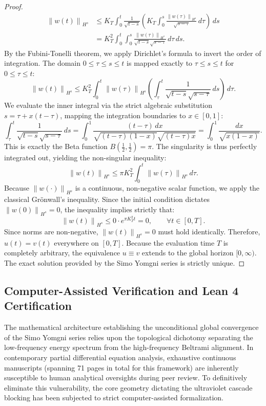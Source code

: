 \documentclass[12pt,a4paper]{article}
\theoremstyle{plain}
\theoremstyle{definition}
\theoremstyle{remark}
\newcommand{\norm}[1]{\left\|#1\right\|}
\begin{document}
\begin{proof}
\begin{align*}
  \norm{w(t)}_{H^s} 
  &\le K_T \int_0^t \frac{1}{\sqrt{t-s}} \left( K_T \int_0^s \frac{\norm{w(\tau)}_{H^s}}{\sqrt{s-\tau}} \,d\tau \right) \,ds \\
  &= K_T^2 \int_0^t \int_0^s \frac{\norm{w(\tau)}_{H^s}}{\sqrt{t-s}\sqrt{s-\tau}} \,d\tau \,ds.
\end{align*}
By the Fubini-Tonelli theorem, we apply Dirichlet's formula to invert the order of integration. The domain $0 \le \tau \le s \le t$ is mapped exactly to $\tau \le s \le t$ for $0 \le \tau \le t$:
\[
  \norm{w(t)}_{H^s} \le K_T^2 \int_0^t \norm{w(\tau)}_{H^s} \left( \int_\tau^t \frac{1}{\sqrt{t-s}\sqrt{s-\tau}} \,ds \right) \,d\tau.
\]
We evaluate the inner integral via the strict algebraic substitution $s = \tau + x(t-\tau)$, mapping the integration boundaries to $x \in [0,1]$:
\[
  \int_\tau^t \frac{1}{\sqrt{t-s}\sqrt{s-\tau}} \,ds = \int_0^1 \frac{(t-\tau)\,dx}{\sqrt{(t-\tau)(1-x)}\sqrt{(t-\tau)x}} = \int_0^1 \frac{dx}{\sqrt{x(1-x)}}.
\]
This is exactly the Beta function $B(\frac{1}{2}, \frac{1}{2}) = \pi$. The singularity is thus perfectly integrated out, yielding the non-singular inequality:
\[
  \norm{w(t)}_{H^s} \le \pi K_T^2 \int_0^t \norm{w(\tau)}_{H^s} \,d\tau.
\]
Because $\norm{w(\cdot)}_{H^s}$ is a continuous, non-negative scalar function, we apply the classical Grönwall's inequality. Since the initial condition dictates $\norm{w(0)}_{H^s} = 0$, the inequality implies strictly that:
\[
  \norm{w(t)}_{H^s} \le 0 \cdot e^{\pi K_T^2 t} = 0, \qquad \forall t \in [0,T].
\]
Since norms are non-negative, $\norm{w(t)}_{H^s} = 0$ must hold identically. Therefore, $u(t) = v(t)$ everywhere on $[0,T]$. Because the evaluation time $T$ is completely arbitrary, the equivalence $u \equiv v$ extends to the global horizon $[0,\infty)$. The exact solution provided by the Simo Yomgni series is strictly unique.
\end{proof}


\subsection{Computer-Assisted Verification and Lean 4 Certification}
\label{subsec:lean4_certification}

The mathematical architecture establishing the unconditional global convergence of the Simo Yomgni series relies upon the topological dichotomy separating the low-frequency energy spectrum from the high-frequency Beltrami alignment. In contemporary partial differential equation analysis, exhaustive continuous manuscripts (spanning 71 pages in total for this framework) are inherently susceptible to human analytical oversights during peer review. To definitively eliminate this vulnerability, the core geometry dictating the ultraviolet cascade blocking has been subjected to strict computer-assisted formalization.
\end{document}
